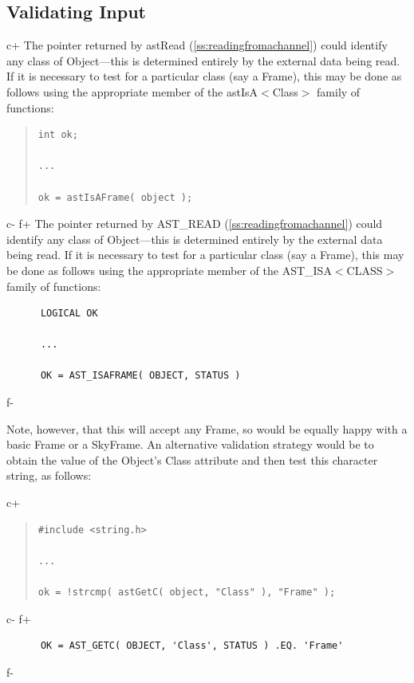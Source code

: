 \documentclass[twoside,11pt]{article}
\newcommand{\secref}[1]{\S\ref{#1}}
\renewcommand{\secref}[1]{\ref{#1}}
\begin{document}
\subsection{\label{ss:validatinginput}Validating Input}

c+
The pointer returned by astRead (\secref{ss:readingfromachannel}) could
identify any class of Object---this is determined entirely by the
external data being read. If it is necessary to test for a particular
class (say a Frame), this may be done as follows using the appropriate
member of the astIsA$<$Class$>$ family of functions:

\begin{quote}
\small
\begin{verbatim}
int ok;

...

ok = astIsAFrame( object );
\end{verbatim}
\normalsize
\end{quote}
c-
f+
The pointer returned by AST\_READ (\secref{ss:readingfromachannel})
could identify any class of Object---this is determined entirely by
the external data being read. If it is necessary to test for a
particular class (say a Frame), this may be done as follows using the
appropriate member of the AST\_ISA$<$CLASS$>$ family of functions:

\small
\begin{verbatim}
      LOGICAL OK

      ...

      OK = AST_ISAFRAME( OBJECT, STATUS )
\end{verbatim}
\normalsize
f-

Note, however, that this will accept any Frame, so would be equally
happy with a basic Frame or a SkyFrame.  An alternative validation
strategy would be to obtain the value of the Object's Class attribute
and then test this character string, as follows:

c+
\begin{quote}
\small
\begin{verbatim}
#include <string.h>

...

ok = !strcmp( astGetC( object, "Class" ), "Frame" );
\end{verbatim}
\normalsize
\end{quote}
c-
f+
\small
\begin{verbatim}
      OK = AST_GETC( OBJECT, 'Class', STATUS ) .EQ. 'Frame'
\end{verbatim}
\normalsize
f-
\end{document}
